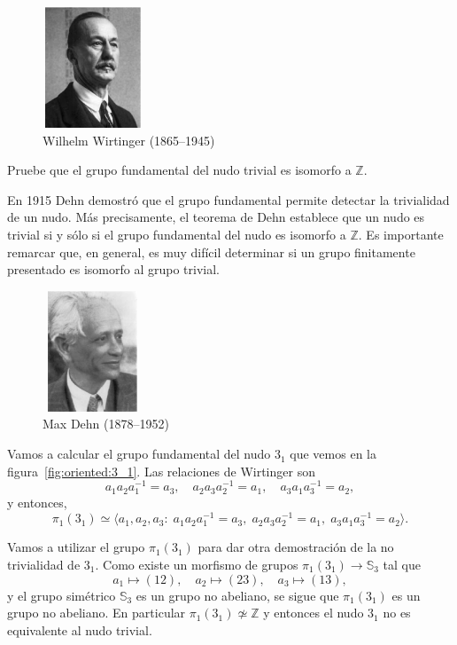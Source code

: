 \documentclass[graybox]{svmult}
\newcommand{\Z}{\mathbb{Z}}
\newcommand{\Sym}{\mathbb{S}}
\begin{document}
    \begin{figure}[h]
		\centering
        \includegraphics[width=30mm,height=36mm]{images/wirtinger}
        \caption{Wilhelm Wirtinger (1865--1945)}
    \end{figure}

\begin{exercise}
    Pruebe que el grupo fundamental del nudo trivial es isomorfo a $\Z$.
\end{exercise}

	En 1915 Dehn demostró que el grupo fundamental permite detectar la
	trivialidad de un nudo. Más precisamente, el teorema de Dehn establece que
	un nudo es trivial si y sólo si el grupo fundamental del nudo es isomorfo a
	$\Z$. Es importante remarcar que, en general, es muy difícil determinar si
	un grupo finitamente presentado es isomorfo al grupo trivial. 

    \begin{figure}[h]
		\centering
        \includegraphics[width=30mm,height=36mm]{images/dehn}
        \caption{Max Dehn (1878--1952)}
    \end{figure}

\begin{example}
    \label{exa:3_1}
    Vamos a calcular el grupo fundamental del nudo $3_1$ que vemos en la
    figura~\ref{fig:oriented:3_1}. Las relaciones de Wirtinger son
    \begin{equation}
        a_1a_2a_1^{-1}=a_3,\quad
        a_2a_3a_2^{-1}=a_1,\quad
        a_3a_1a_3^{-1}=a_2,
    \end{equation}
    y entonces, 
    \[
        \pi_1(3_1)\simeq\langle a_1,a_2,a_3:\;
        a_1a_2a_1^{-1}=a_3,\;a_2a_3a_2^{-1}=a_1,\;a_3a_1a_3^{-1}=a_2\rangle.
    \]

    Vamos a utilizar el grupo $\pi_1(3_1)$ para dar otra demostración de la no
    trivialidad de $3_1$.  Como existe un morfismo de grupos
    $\pi_1(3_1)\to\Sym_3$ tal que 
    \[
        a_1\mapsto(12),\quad
        a_2\mapsto(23),\quad
        a_3\mapsto(13),
    \]
    y el grupo simétrico $\Sym_3$ es un grupo no abeliano, se sigue que
    $\pi_1(3_1)$ es un grupo no abeliano. En particular
    $\pi_1(3_1)\not\simeq\Z$ y entonces el nudo $3_1$ no es equivalente al nudo
    trivial. 
\end{example}
\end{document}
